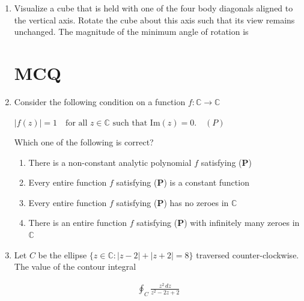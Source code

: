 \documentclass[journal]{IEEEtran}
\numberwithin{equation}{enumi}
\numberwithin{figure}{enumi}
\begin{document}
\begin{enumerate}
\item

Visualize a cube that is held with one of the four body diagonals aligned to the vertical axis. Rotate the cube about this axis such that its view remains unchanged. The magnitude of the minimum angle of rotation is 


\begin{enumerate}
\end{enumerate}

\bigskip

\section*{MCQ}
\item 

Consider the following condition on a function $ f : \mathbb{C} \to \mathbb{C} $

$
|f(z)| = 1 \quad \text{for all } z \in \mathbb{C} \text{ such that } \text{Im}(z) = 0. \quad (P)
$

Which one of the following is correct?


\begin{enumerate}
        \item There is a non-constant analytic polynomial $ f $ satisfying (\textbf{P})
        \item  Every entire function $ f $ satisfying (\textbf{P}) is a constant function
        \item Every entire function $ f $ satisfying (\textbf{P}) has no zeroes in $ \mathbb{C} $
        \item  There is an entire function $ f $ satisfying (\textbf{P}) with infinitely many zeroes in $ \mathbb{C} $
\end{enumerate}


\bigskip

\item 

Let $ C $ be the ellipse $ \{ z \in \mathbb{C} : |z - 2| + |z + 2| = 8 \} $ traversed counter-clockwise. The value of the contour integral 

\begin{align*}
\oint_C \frac{z^2 \, dz}{z^2 - 2z + 2}
\end{align*}


\end{enumerate}
\end{document}
